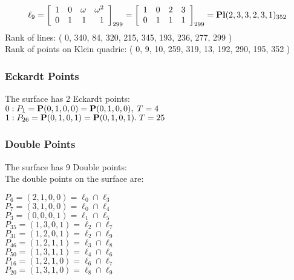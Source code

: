 \documentclass{article}
\newcommand{\bP}{{\bf P}}
\begin{document}
{$$\ell_{9} = 
\left[
\begin{array}{*{4}{r}}
1 & 0 & \omega  & \omega^{2}\\
0 & 1 & 1 & 1\\
\end{array}
\right]
_{299}
=
\left[
\begin{array}{*{4}c}
1  & 0  & 2  & 3\\
0  & 1  & 1  & 1\\
\end{array}
\right]_{299}
={\rm\bf Pl}(2,3,3,2,3,1 )_{352}$$
Rank of lines: ( 0, 340, 84, 320, 215, 345, 193, 236, 277, 299 )\\
Rank of points on Klein quadric: ( 0, 9, 10, 259, 319, 13, 192, 290, 195, 352 )\\
\subsubsection*{Eckardt Points}
The surface has 2 Eckardt points:\\
$0 : P_{1}=\bP(0, 1, 0, 0) = \bP(0, 1, 0, 0),\; T= 4$\\
$1 : P_{26}=\bP(0, 1, 0, 1) = \bP(0, 1, 0, 1).\; T= 25$\\
\subsubsection*{Double Points}
The surface has 9 Double points:\\
The double points on the surface are:\\
\begin{multicols}{2}
\noindent
$P_{6} = ( 2, 1, 0, 0 ) = \ell_{0} \cap \ell_{3} $\\
$P_{7} = ( 3, 1, 0, 0 ) = \ell_{0} \cap \ell_{4} $\\
$P_{3} = ( 0, 0, 0, 1 ) = \ell_{1} \cap \ell_{5} $\\
$P_{35} = ( 1, 3, 0, 1 ) = \ell_{2} \cap \ell_{7} $\\
$P_{31} = ( 1, 2, 0, 1 ) = \ell_{2} \cap \ell_{9} $\\
$P_{46} = ( 1, 2, 1, 1 ) = \ell_{3} \cap \ell_{8} $\\
$P_{50} = ( 1, 3, 1, 1 ) = \ell_{4} \cap \ell_{6} $\\
$P_{16} = ( 1, 2, 1, 0 ) = \ell_{6} \cap \ell_{7} $\\
$P_{20} = ( 1, 3, 1, 0 ) = \ell_{8} \cap \ell_{9} $\\
\end{multicols}
}
\end{document}
